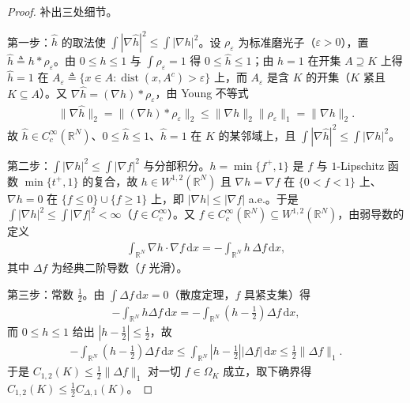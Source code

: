 \documentclass[../../main.tex]{subfiles}%
\begin{document}
\begin{proof}
补出三处细节。

第一步：$\widehat h$ 的取法使 $\int|\nabla\widehat h|^2\leqslant\int|\nabla h|^2$。设 $\rho_\varepsilon$ 为标准磨光子（$\varepsilon>0$），置 $\widehat h\triangleq h*\rho_\varepsilon$。由 $0\leqslant h\leqslant1$ 与 $\int\rho_\varepsilon=1$ 得 $0\leqslant\widehat h\leqslant1$；由 $h=1$ 在开集 $A\supseteq K$ 上得 $\widehat h=1$ 在 $A_\varepsilon\triangleq\{x\in A:\operatorname{dist}(x,A^c)>\varepsilon\}$ 上，而 $A_\varepsilon$ 是含 $K$ 的开集（$K$ 紧且 $K\subseteq A$）。又 $\nabla\widehat h=(\nabla h)*\rho_\varepsilon$，由 Young 不等式
\begin{align*}
\|\nabla\widehat h\|_2=\|(\nabla h)*\rho_\varepsilon\|_2\leqslant\|\nabla h\|_2\|\rho_\varepsilon\|_1=\|\nabla h\|_2.
\end{align*}
故 $\widehat h\in C^\infty_c(\mathbb{R}^N)$、$0\leqslant\widehat h\leqslant1$、$\widehat h=1$ 在 $K$ 的某邻域上，且 $\int|\nabla\widehat h|^2\leqslant\int|\nabla h|^2$。

第二步：$\int|\nabla h|^2\leqslant\int|\nabla f|^2$ 与分部积分。$h=\min\{f^+,1\}$ 是 $f$ 与 $1$-Lipschitz 函数 $\min\{t^+,1\}$ 的复合，故 $h\in W^{1,2}(\mathbb{R}^N)$ 且 $\nabla h=\nabla f$ 在 $\{0<f<1\}$ 上、$\nabla h=0$ 在 $\{f\leqslant0\}\cup\{f\geqslant1\}$ 上，即 $|\nabla h|\leqslant|\nabla f|$ a.e.。于是 $\int|\nabla h|^2\leqslant\int|\nabla f|^2<\infty$（$f\in C^\infty_c$）。又 $f\in C^\infty_c(\mathbb{R}^N)\subseteq W^{1,2}(\mathbb{R}^N)$，由弱导数的定义
\begin{align*}
\int_{\mathbb{R}^N}\nabla h\cdot\nabla f\,\mathrm{d}x=-\int_{\mathbb{R}^N}h\,\Delta f\,\mathrm{d}x,
\end{align*}
其中 $\Delta f$ 为经典二阶导数（$f$ 光滑）。

第三步：常数 $\frac12$。由 $\int\Delta f\,\mathrm{d}x=0$（散度定理，$f$ 具紧支集）得
\begin{align*}
-\int_{\mathbb{R}^N}h\Delta f\,\mathrm{d}x=-\int_{\mathbb{R}^N}\left(h-\frac12\right)\Delta f\,\mathrm{d}x,
\end{align*}
而 $0\leqslant h\leqslant1$ 给出 $|h-\frac12|\leqslant\frac12$，故
\begin{align*}
-\int_{\mathbb{R}^N}\left(h-\frac12\right)\Delta f\,\mathrm{d}x
\leqslant\int_{\mathbb{R}^N}\left|h-\frac12\right||\Delta f|\,\mathrm{d}x\leqslant\frac12\|\Delta f\|_1.
\end{align*}
于是 $C_{1,2}(K)\leqslant\frac12\|\Delta f\|_1$ 对一切 $f\in\Omega_K$ 成立，取下确界得 $C_{1,2}(K)\leqslant\frac12C_{\Delta,1}(K)$。
\end{proof}
\end{document}
